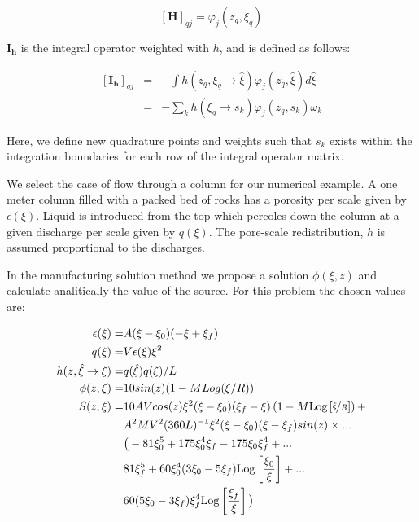 \documentclass{CFD2011}
\newcommand{\Fede}[1]{\textcolor{green}{Fede: #1} \\}
\newcommand{\Pablo}[1]{#1}
\begin{document}
\begin{equation}
\left[\mathbf{H}\right]_{qj}=\varphi_j(z_q,\xi_q)
\end{equation}

$\mathbf{I_h}$ is the integral operator weighted with $h$, and is defined as follows:

\begin{eqnarray}
\left[\mathbf{I_h}\right]_{qj}&=& \Pablo{-} \int h(z_q,\xi_q\rightarrow\hat{\xi})\varphi_j(z_q,\hat{\xi}) d\hat{\xi}\nonumber \\
&=& \Pablo{-} \sum_k h(\xi_q\rightarrow s_k )\varphi_j(z_q,s_k) \omega_k
\end{eqnarray}

Here, we define new quadrature points and weights such that $s_k$ exists within the integration boundaries for each row of the integral operator matrix. 



We select the case of flow through a column for our numerical example. A one meter column filled with a packed bed of rocks has a porosity per scale given by $\epsilon({\xi})$. Liquid is introduced from the top which percoles down the column at a given discharge per scale given by $q({\xi})$. The pore-scale redistribution, $h$  is assumed proportional to the discharges.

In the manufacturing solution method we propose a solution $\phi(\xi, z)$ and calculate analitically the value of the source. For this problem the chosen values are:

\begin{align}
\epsilon(\xi)=&A (\xi-\xi_0) (-\xi+\xi_f) \\
q({\xi}) =&V \epsilon(\xi) \xi^2\\
h(z, \hat \xi \rightarrow \xi) =& q(\hat \xi) q(\xi)/L\\
\phi(z, \xi) =& 10 sin(z) (1-M Log({\xi}/R))\\
\nonumber S(z, \xi)=& 10 A V cos(z) {\xi}^2 ({\xi}-\xi_0) (\xi_f-{\xi}) \left(1-M \text{Log}\left[\nicefrac{{\xi}}{R}\right]\right) +\\
\nonumber  &A^2 M V^2  (360 L)^{-1} {\xi}^2 ({\xi}-\xi_0) ({\xi}-\xi_f) sin(z) \times ... \\
\nonumber  &\big(-81 \xi_0^5+175 \xi_0^4 \xi_f-175 \xi_0 \xi_f^4+  ...\\
\nonumber &81 \xi_f^5+60 \xi_0^4 (3 \xi_0-5 \xi_f) \text{Log}\left[\frac{\xi_0}{{\xi}}\right]+ ...\\
& 60 (5 \xi_0-3 \xi_f) \xi_f^4 \text{Log}\left[\frac{\xi_f}{{\xi}}\right]\big)
\end{align}
\end{document}
